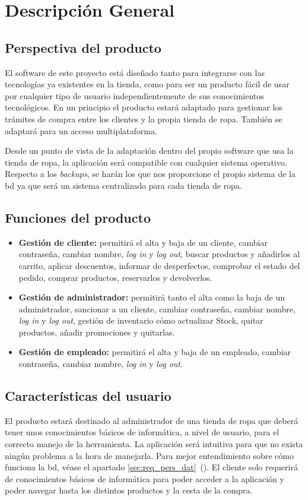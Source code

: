 \section{Descripción General }
\label{sec:desc_gen}
\subsection{Perspectiva del producto}
El software de este proyecto está diseñado tanto para integrarse con las tecnologías ya existentes en la tienda, como para ser un producto fácil de usar por cualquier tipo de usuario independientemente de sus conocimientos tecnológicos.
En un principio el producto estará adaptado para gestionar los trámites de compra entre los clientes y la propia tienda de ropa. También se adaptará para un acceso multiplataforma.

Desde un punto de vista de la adaptación dentro del propio software que usa la tienda de ropa, la aplicación será compatible con cualquier sistema operativo.\\
Respecto a los \textit{backups}, se harán los que nos proporcione el propio sistema de la \gls{bd} ya que será un sistema centralizado para cada tienda de ropa.
\subsection{Funciones del producto}
\begin{itemize}
    \item\textbf{Gestión de cliente: }permitirá el alta y baja de un cliente, cambiar contraseña, cambiar nombre, \textit{log in} y \textit{log out}, buscar productos y añadirlos al carrito, aplicar descuentos, informar de desperfectos, comprobar el estado del pedido, comprar productos, reservarlos y devolverlos.
    \item\textbf{Gestión de administrador: }permitirá tanto el alta como la baja de un administrador, sancionar a un cliente, cambiar contraseña, cambiar nombre, \textit{log in} y \textit{log out}, gestión de inventario cómo actualizar Stock, quitar productos, añadir promociones y quitarlas.
    \item\textbf{Gestión de empleado: }permitirá el alta y baja de un empleado, cambiar contraseña, cambiar nombre, \textit{log in} y \textit{log out}.
\end{itemize}

\subsection{Características del usuario}
El producto estará destinado al administrador de una tienda de ropa que deberá tener unos conocimientos básicos de informática, a nivel de usuario, para el correcto manejo de la herramienta. La aplicación será intuitiva para que no exista ningún problema a la hora de manejarla. Para mejor entendimiento sobre cómo funciona la \gls{bd}, véase el apartado \ref{sec:req_pers_dat}~().
El cliente solo requerirá de conocimientos básicos de informática para poder acceder a la aplicación y poder navegar hasta los distintos productos y la cesta de la compra.

